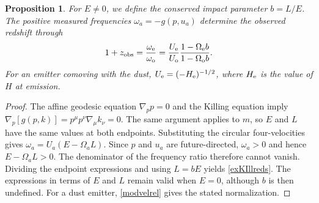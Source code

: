 \documentclass[amsmath,amsfonts,amssymb,aps,pra,superscriptaddress,10pt]{revtex4-2}
\numberwithin{equation}{section}
\theoremstyle{plain}
\newtheorem{proposition}{Proposition}
\theoremstyle{definition}
\theoremstyle{remark}
\theoremstyle{definition}
\begin{document}
\begin{proposition}
For $E\neq 0$, we define the conserved impact parameter $b=L/E$. The positive measured frequencies $\omega_a=-g(p,u_a)$ determine the observed redshift through
\begin{equation}\label{exKIllreds}
1+z_{\rm{obs}}=\frac{\omega_{\rm{e}}}{\omega_{\rm{o}}}
=\frac{U_{\rm{e}}}{U_{\rm{o}}}
\frac{1-\Omega_{\rm{e}}b}{1-\Omega_{\rm{o}}b}.
\end{equation}
For an emitter comoving with the dust, $U_{\rm{e}}=(-H_{\rm{e}})^{-1/2}$, where $H_{\rm{e}}$ is the value of $H$ at emission.
\end{proposition}

\begin{proof}
The affine geodesic equation $\nabla_p p=0$ and the Killing equation imply
$\nabla_p[g(p,k)]=p^\mu p^\nu\nabla_\mu k_\nu=0$. The same argument applies to $m$, so $E$ and $L$ have the same values at both endpoints. Substituting the circular four-velocities gives $\omega_a=U_a(E-\Omega_a L)$. Since $p$ and $u_a$ are future-directed, $\omega_a>0$ and hence $E-\Omega_a L>0$. The denominator of the frequency ratio therefore cannot vanish. Dividing the endpoint expressions and using $L=bE$ yields \eqref{exKIllreds}. The expressions in terms of $E$ and $L$ remain valid when $E=0$, although $b$ is then undefined. For a dust emitter, \eqref{modvelrel} gives the stated normalization.
\end{proof}
\end{document}
